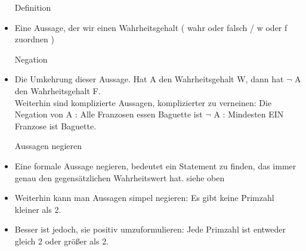 \documentclass[smallheadings,headsepline,12pt,a4paper]{scrartcl}
\begin{document}
\begin{itemize}
\item[Definition] 
\item 	Eine Aussage, der wir einen Wahrheitsgehalt ( wahr oder falsch / w oder f zuordnen )

\item[Negation] 
\item 	Die Umkehrung dieser Aussage. Hat A den Wahrheitsgehalt W, dann hat $\neg$ A den Wahrheitsgehalt F. \\ 

Weiterhin sind komplizierte Aussagen, komplizierter zu verneinen: Die Negation von A : Alle Franzosen essen Baguette ist $\neg$ A : Mindesten EIN Franzose ist Baguette. \\

\item[Aussagen negieren]
\item Eine formale Aussage negieren, bedeutet ein Statement zu finden, das immer genau den gegensätzlichen Wahrheitswert hat. siehe oben\\
\item Weiterhin kann man Aussagen simpel negieren: Es gibt keine Primzahl kleiner als 2. 
\item Besser ist jedoch, sie positiv umzuformulieren: Jede Primzahl ist entweder gleich 2 oder größer als 2.


\end{itemize}
\end{document}
